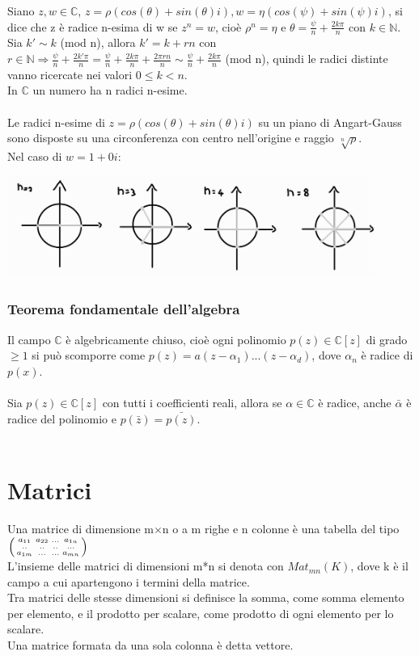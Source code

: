 \documentclass{article}
\newcommand{\smat}{psmallmatrix}
\newcommand{\C}{\mathds{C}}
\begin{document}
Siano $z,w\in\mathds{C}$, $z=\rho(cos(\theta)+sin(\theta)i),w=\eta(cos(\psi)+sin(\psi)i)$, si dice che z è radice n-esima di w se $z^n=w$, cioè $\rho^n=\eta$ e $\theta=\frac{\psi}{n}+\frac{2k\pi}{n}$ con $k\in\mathds{N}$.\\
Sia $k'\sim k$ (mod n), allora $k'=k+rn$ con $r\in\mathds{N}\Rightarrow\frac{\psi}{n}+\frac{2k'\pi}{n}=\frac{\psi}{n}+\frac{2k\pi}{n}+\frac{2\pi rn}{n}\sim \frac{\psi}{n}+\frac{2k\pi}{n}$ (mod n), quindi le radici distinte vanno ricercate nei valori $0\leq k<n$.\\
In $\mathds{C}$ un numero ha n radici n-esime.\\\\
Le radici n-esime di $z=\rho(cos(\theta)+sin(\theta)i)$ su un piano di Angart-Gauss sono disposte su una circonferenza con centro nell'origine e raggio $\sqrt[n]{\rho}$.\\
Nel caso di $w=1+0i$:
\begin{center}
\includegraphics[width=0.9\textwidth]{im5}
\end{center}


\subsubsection{Teorema fondamentale dell'algebra}
Il campo $\C$ è algebricamente chiuso, cioè ogni polinomio $p(z)\in\C[z]$ di grado $\geq1$ si può scomporre come $p(z)=a(z-\alpha_1)...(z-\alpha_d)$, dove $\alpha_n$ è radice di $p(x)$.\\\\
Sia $p(z)\in\C[z]$ con tutti i coefficienti reali, allora se $\alpha\in\C$ è radice, anche $\bar{\alpha}$ è radice del polinomio e $p(\bar{z})=\bar{p(z)}$.\\\


\section{Matrici}
Una matrice di dimensione m$\times$n o a m righe e n colonne è una tabella del tipo $\begin{\smat} a_{11} & a_{22} & ... & a_{1n} \\ .. & .. & .. & ... \\ a_{1m} & ... & ... & a_{mn} \end{\smat}$\\
L'insieme delle matrici di dimensioni m*n si denota con $Mat_{mn}(K)$, dove k è il campo a cui apartengono i termini della matrice.\\
Tra matrici delle stesse dimensioni si definisce la somma, come somma elemento per elemento, e il prodotto per scalare, come prodotto di ogni elemento per lo scalare.\\
Una matrice formata da una sola colonna è detta vettore.
\end{document}
